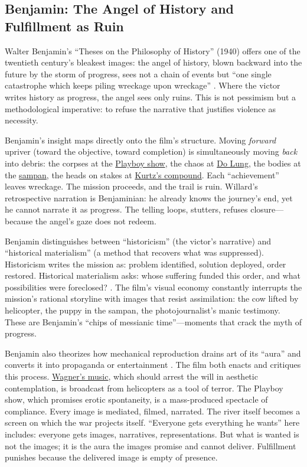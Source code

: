 \subsection*{Benjamin: The Angel of History and Fulfillment as Ruin}
\label{ssec:v-benjamin}
Walter Benjamin's ``Theses on the Philosophy of History'' (1940) offers one of the twentieth
century's bleakest images: the angel of history, blown backward into the future by the storm
of progress, sees not a chain of events but ``one single catastrophe which keeps piling
wreckage upon wreckage'' \parencite{BenjaminTheses1969}. Where the victor writes history as
progress, the angel sees only ruins. This is not pessimism but a methodological imperative: to
refuse the narrative that justifies violence as necessity.

Benjamin's insight maps directly onto the film's structure. Moving \emph{forward} upriver
(toward the objective, toward completion) is simultaneously moving \emph{back} into debris:
the corpses at the \hyperref[scene:playboy-show]{Playboy show}, the chaos at
\hyperref[scene:do-lung-bridge]{Do Lung}, the bodies at the \hyperref[scene:sampan]{sampan},
the heads on stakes at \hyperref[scene:kurtz-compound]{Kurtz's compound}. Each ``achievement''
leaves wreckage. The mission proceeds, and the trail is ruin. Willard's retrospective narration
is Benjaminian: he already knows the journey's end, yet he cannot narrate it as progress. The
telling loops, stutters, refuses closure---because the angel's gaze does not redeem.

Benjamin distinguishes between ``historicism'' (the victor's narrative) and ``historical
materialism'' (a method that recovers what was suppressed). Historicism writes the mission as:
problem identified, solution deployed, order restored. Historical materialism asks: whose
suffering funded this order, and what possibilities were foreclosed?
\parencite{BenjaminTheses1969}. The film's visual economy constantly interrupts the mission's
rational storyline with images that resist assimilation: the cow lifted by helicopter, the
puppy in the sampan, the photojournalist's manic testimony. These are Benjamin's ``chips of
messianic time''---moments that crack the myth of progress.

Benjamin also theorizes how mechanical reproduction drains art of its ``aura'' and converts it
into propaganda or entertainment \parencite{BenjaminArtwork1969}. The film both enacts and
critiques this process. \hyperref[scene:kilgore-beach]{Wagner's music}, which should arrest the
will in aesthetic contemplation, is broadcast from helicopters as a tool of terror. The
Playboy show, which
promises erotic spontaneity, is a mass-produced spectacle of compliance. Every image is
mediated, filmed, narrated. The river itself becomes a screen on which the war projects itself.
``Everyone gets everything he wants'' here includes: everyone gets images, narratives,
representations. But what is wanted is not the images; it is the aura the images promise and
cannot deliver. Fulfillment punishes because the delivered image is empty of presence.


